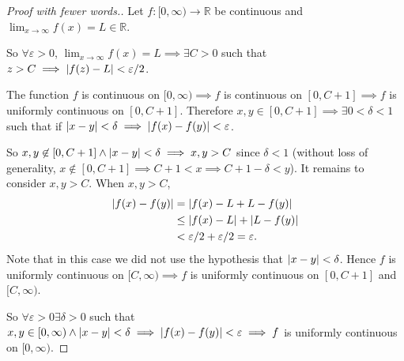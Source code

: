 \documentclass[11pt]{amsart}
\begin{document}
\begin{proof}[Proof with fewer words.]
    Let $f\colon [0,\infty)\to \mathbb{R}$ be continuous and $\lim_{x\to \infty} f(x) = L \in \mathbb{R}$.

    So $\forall \varepsilon>0$, $\lim_{x\to \infty} f(x) = L\implies \exists C>0$ such that $z>C\implies \abs{f(z)-L}< \varepsilon/2$.

    The function $f$ is continuous on $[0,\infty)\implies f$ is continuous on $[0,C+1] \implies f$ is uniformly continuous on $[0,C+1]$. Therefore $x,y\in[0,C+1]\implies \exists 0 < \delta < 1$ such that if $\abs{x-y}< \delta \implies \abs{f(x)-f(y)}< \varepsilon$.

    So $x,y\not\in [0,C+1] \land \abs{x-y}<\delta\implies x,y > C$ since $\delta < 1$ (without loss of generality,  $x\not\in [0,C+1] \implies C+1< x \implies C+1-\delta < y$). It remains to consider $x,y > C$. When $x,y>C$, \begin{align*}
        \abs{f(x)-f(y)} &= \abs{f(x)-L+L-f(y)}\\
        &\leq \abs{f(x)-L} + \abs{L-f(y)}\\
        &< \varepsilon/2 + \varepsilon/2 = \varepsilon.
    \end{align*} Note that in this case we did not use the hypothesis that $\abs{x-y}< \delta$. Hence $f$ is uniformly continuous on $[C,\infty) \implies f$ is uniformly continuous on $[0,C+1]$ and $[C,\infty)$.
    
    So $\forall \varepsilon>0 \exists \delta >0$ such that $x,y\in [0,\infty)\land \abs{x-y}< \delta\implies \abs{f(x)-f(y)} < \varepsilon\implies f$ is uniformly continuous on $[0,\infty)$.
\end{proof}
\end{document}
